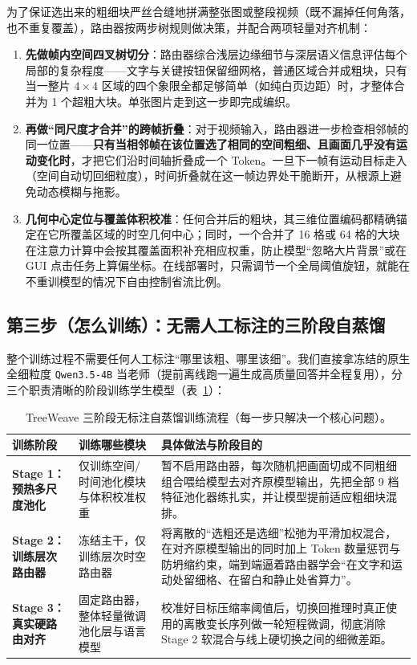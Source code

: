 \documentclass[11pt,a4paper]{ctexart}
\begin{document}
为了保证选出来的粗细块严丝合缝地拼满整张图或整段视频（既不漏掉任何角落，也不重复覆盖），路由器按两步树规则做决策，并配合两项轻量对齐机制：
\begin{enumerate}[leftmargin=1.6em, itemsep=4pt]
  \item \textbf{先做帧内空间四叉树切分}：路由器综合浅层边缘细节与深层语义信息评估每个局部的复杂程度——文字与关键按钮保留细网格，普通区域合并成粗块，只有当一整片 $4{\times}4$ 区域的四个象限全都足够简单（如纯白页边距）时，才整体合并为 1 个超粗大块。单张图片走到这一步即完成编织。
  \item \textbf{再做``同尺度才合并''的跨帧折叠}：对于视频输入，路由器进一步检查相邻帧的同一位置——\textbf{只有当相邻帧在该位置选了相同的空间粗细、且画面几乎没有运动变化时}，才把它们沿时间轴折叠成一个 Token。一旦下一帧有运动目标走入（空间自动切回细粒度），时间折叠就在这一帧边界处干脆断开，从根源上避免动态模糊与拖影。
  \item \textbf{几何中心定位与覆盖体积校准}：任何合并后的粗块，其三维位置编码都精确锚定在它所覆盖区域的时空几何中心；同时，一个合并了 16 格或 64 格的大块在注意力计算中会按其覆盖面积补充相应权重，防止模型``忽略大片背景''或在 GUI 点击任务上算偏坐标。在线部署时，只需调节一个全局阈值旋钮，就能在不重训模型的情况下自由控制省流比例。
\end{enumerate}

\subsection{第三步（怎么训练）：无需人工标注的三阶段自蒸馏}

整个训练过程不需要任何人工标注``哪里该粗、哪里该细''。我们直接拿冻结的原生全细粒度 \texttt{Qwen3.5-4B} 当老师（提前离线跑一遍生成高质量回答并全程复用），分三个职责清晰的阶段训练学生模型（表~\ref{tab:three-stage}）：

\begin{table}[H]
\centering
\footnotesize
\setlength{\tabcolsep}{6pt}
\caption{TreeWeave 三阶段无标注自蒸馏训练流程（每一步只解决一个核心问题）。}
\label{tab:three-stage}
\begin{tabularx}{\linewidth}{@{}l p{3.1cm} >{\raggedright\arraybackslash}X@{}}
\toprule
\textbf{训练阶段} & \textbf{训练哪些模块} & \textbf{具体做法与阶段目的} \\
\midrule
\textbf{Stage 1：预热多尺度池化} & 仅训练空间/时间池化模块与体积校准权重 & 暂不启用路由器，每次随机把画面切成不同粗细组合喂给模型去对齐原模型输出，先把全部 9 档特征池化器练扎实，并让模型提前适应粗细块混排。 \\
\textbf{Stage 2：训练层次路由器} & 冻结主干，仅训练层次时空路由器 & 将离散的``选粗还是选细''松弛为平滑加权混合，在对齐原模型输出的同时加上 Token 数量惩罚与防坍缩约束，端到端逼着路由器学会``在文字和运动处留细格、在留白和静止处省算力''。 \\
\textbf{Stage 3：真实硬路由对齐} & 固定路由器，整体轻量微调池化层与语言模型 & 校准好目标压缩率阈值后，切换回推理时真正使用的离散变长序列做一轮短程微调，彻底消除Stage 2 软混合与线上硬切换之间的细微差距。 \\
\bottomrule
\end{tabularx}
\end{table}
\end{document}
